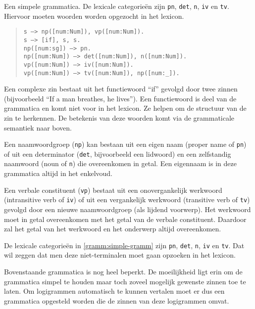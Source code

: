 \begin{ex}
  Een simpele grammatica. De lexicale categorieën zijn \texttt{pn}, \texttt{det}, \texttt{n}, \texttt{iv} en \texttt{tv}. Hiervoor moeten woorden worden opgezocht in het lexicon.
  \label{gramm:simple-gramm}
  \begin{quote}
    \texttt{s ---> np([num:Num]), vp([num:Num]).} \\
    \texttt{s ---> [if], s, s.} \\
    \texttt{np([num:sg]) ---> pn.} \\
    \texttt{np([num:Num]) ---> det([num:Num]), n([num:Num]).} \\
    \texttt{vp([num:Num]) ---> iv([num:Num]).} \\
    \texttt{vp([num:Num]) ---> tv([num:Num]), np([num:\_]).} \\
  \end{quote}
\end{ex} 

Een complexe zin bestaat uit het functiewoord ``if'' gevolgd door twee zinnen (bijvoorbeeld ``If a man breathes, he lives''). Een functiewoord is deel van de grammatica en komt niet voor in het lexicon. Ze helpen om de structuur van de zin te herkennen. De betekenis van deze woorden komt via de grammaticale semantiek naar boven.

Een naamwoordgroep (\texttt{np}) kan bestaan uit een eigen naam (proper name of \texttt{pn}) of uit een determinator (\texttt{det}, bijvoorbeeld een lidwoord) en een zelfstandig naamwoord (noun of \texttt{n}) die overeenkomen in getal. Een eigennaam is in deze grammatica altijd in het enkelvoud.

Een verbale constituent (\texttt{vp}) bestaat uit een onovergankelijk werkwoord (intransitive verb of \texttt{iv}) of uit een vergankelijk werkwoord (transitive verb of \texttt{tv}) gevolgd door een nieuwe naamwoordgroep (als lijdend voorwerp). Het werkwoord moet in getal overeenkomen met het getal van de verbale constituent. Daardoor zal het getal van het werkwoord en het onderwerp altijd overeenkomen.

De lexicale categorieën in \autoref{gramm:simple-gramm} zijn \texttt{pn}, \texttt{det}, \texttt{n}, \texttt{iv} en \texttt{tv}. Dat wil zeggen dat men deze niet-terminalen moet gaan opzoeken in het lexicon.

Bovenstaande grammatica is nog heel beperkt. De moeilijkheid ligt erin om de grammatica simpel te houden maar toch zoveel mogelijk gewenste zinnen toe te laten. Om logigrammen automatisch te kunnen vertalen moet er dus een grammatica opgesteld worden die de zinnen van deze logigrammen omvat.

